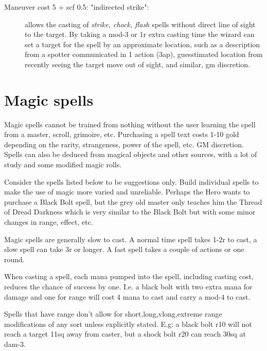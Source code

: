 \begin{description}
\item[Maneuver cost 5 + scf 0.5: "indirected strike":] allows the casting of \emph{strike, chock, flash} spells without direct line of sight to the target. By taking a mod-3 or 1r extra casting time the wizard can set a target for the spell by an approximate location, such as a description from a spotter communicated in 1 action (3ap), guesstimated location from recently seeing the target move out of sight, and similar, gm discretion.


\end{description}







\section*{Magic spells}

Magic spells cannot be trained from nothing without the user learning the spell from a master, scroll, grimoire, etc. Purchasing a spell text costs 1-10 gold depending on the rarity, strangeness, power of the spell, etc. GM discretion.
Spells can also be deduced from magical objects and other sources, with a lot of study and some modified magic rolls.

Consider the spells listed below to be suggestions only. Build individual spells to make the use of magic more varied and unreliable. Perhaps the Hero wants to purchase a Black Bolt spell, but the grey old master only teaches him the Thread of Dread Darkness which is very similar to the Black Bolt but with some minor changes in range, effect, etc.

Magic spells are generally slow to cast. A normal time spell takes 1-2r to cast, a slow spell can take 3r or longer. A fast spell takes a couple of actions or one round.

When casting a spell, each mana pumped into the spell, including casting cost, reduces the chance of success by one. I.e. a black bolt with two extra mana for damage and one for range will cost 4 mana to cast and carry a mod-4 to cast.

Spells that have range don't allow for short,long,vlong,extreme range modifications of any sort unless explicitly stated. E.g: a black bolt r10 will not reach a target 11sq away from caster, but a shock bolt r20 can reach 30sq at dam-3.


